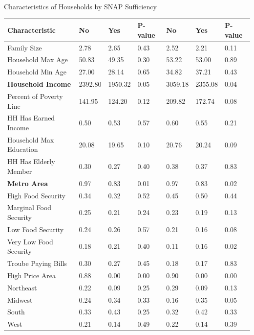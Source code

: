 \documentclass{beamer}
\begin{document}
\begin{frame}
\begin{table}{Characteristics of Households by SNAP Sufficiency}
\begin{adjustbox}{max width=\textwidth}
\begin{tabular}{lllllll}
    Characteristic & No    & Yes   & P-value & No    & Yes   & P-value \\
    \midrule
    Family Size & 2.78  & 2.65  & 0.43  & 2.52  & 2.21  & 0.11 \\
    Household Max Age & 50.83 & 49.35 & 0.30  & 53.22 & 53.00 & 0.89 \\
    Household Min Age & 27.00 & 28.14 & 0.65  & 34.82 & 37.21 & 0.43 \\
    \textbf{Household Income} & 2392.80 & 1950.32 & 0.05  & 3059.18 & 2355.08 & 0.04 \\
    Percent of Poverty Line & 141.95 & 124.20 & 0.12  & 209.82 & 172.74 & 0.08 \\
    HH Has Earned Income & 0.50  & 0.53  & 0.57  & 0.60  & 0.55  & 0.21 \\
    Household Max Education & 20.08 & 19.65 & 0.10  & 20.76 & 20.24 & 0.09 \\
    HH Has Elderly Member & 0.30  & 0.27  & 0.40  & 0.38  & 0.37  & 0.83 \\
      \textbf{Metro Area} & 0.97  & 0.83  & 0.01  & 0.97  & 0.83  & 0.02 \\
    High Food Security & 0.34  & 0.32  & 0.52  & 0.45  & 0.50  & 0.44 \\
    Marginal Food Security & 0.25  & 0.21  & 0.24  & 0.23  & 0.19  & 0.13 \\
    Low Food Security & 0.24  & 0.26  & 0.57  & 0.21  & 0.16  & 0.08 \\
    Very Low Food Security & 0.18  & 0.21  & 0.40  & 0.11  & 0.16  & 0.02 \\
    Troube Paying Bills & 0.30  & 0.27  & 0.45  & 0.18  & 0.17  & 0.83 \\
    High Price Area & 0.88  & 0.00  & 0.00  & 0.90  & 0.00  & 0.00 \\
    Northeast & 0.22  & 0.09  & 0.25  & 0.29  & 0.09  & 0.13 \\
    Midwest & 0.24  & 0.34  & 0.33  & 0.16  & 0.35  & 0.05 \\
    South & 0.33  & 0.43  & 0.25  & 0.32  & 0.42  & 0.33 \\
    West  & 0.21  & 0.14  & 0.49  & 0.22  & 0.14  & 0.39 \\

    
    \bottomrule
\end{tabular}
\end{adjustbox}
\end{table}
\end{frame}


\end{document}
